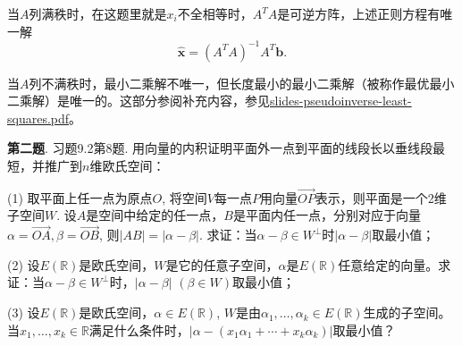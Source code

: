 \begin{figure}[H]
\centering
{}
\end{figure}

当$A$列满秩时，在这题里就是$x_i$不全相等时，$A^TA$是可逆方阵，上述正则方程有唯一解
$$\widehat{\mathbf{x}} = (A^TA)^{-1}A^T\mathbf{b}.$$

当$A$列不满秩时，最小二乘解不唯一，但长度最小的最小二乘解（被称作最优最小二乘解）是唯一的。这部分参阅补充内容，参见\href{https://github.com/wenh06/buaa-advanced-algebra-2021/blob/master/pdf/slides-pseudoinverse-least-squares.pdf}{slides-pseudoinverse-least-squares.pdf}。


\newpageorvspace


{\bf 第二题}. 习题9.2第8题. 用向量的内积证明平面外一点到平面的线段长以垂线段最短，并推广到$n$维欧氏空间：

(1) 取平面上任一点为原点$O$, 将空间$V$每一点$P$用向量$\overrightarrow{OP}$表示，则平面是一个2维子空间$W$. 设$A$是空间中给定的任一点，$B$是平面内任一点，分别对应于向量$\alpha = \overrightarrow{OA}, \beta = \overrightarrow{OB}$, 则$\lvert AB \rvert = \lvert \alpha - \beta \rvert$. 求证：当$\alpha - \beta \in W^{\perp}$时$\lvert \alpha - \beta \rvert$取最小值；

(2) 设$E(\mathbb{R})$是欧氏空间，$W$是它的任意子空间，$\alpha$是$E(\mathbb{R})$任意给定的向量。求证：当$\alpha - \beta \in W^{\perp}$时，$\lvert \alpha - \beta \rvert$ $(\beta \in W)$取最小值；

(3) 设$E(\mathbb{R})$是欧氏空间，$\alpha \in E(\mathbb{R})$, $W$是由$\alpha_1, \ldots, \alpha_k \in E(\mathbb{R})$生成的子空间。当$x_1, \ldots, x_k \in \mathbb{R}$满足什么条件时，$\lvert \alpha - (x_1\alpha_1 + \cdots + x_k\alpha_k) \rvert$取最小值？

